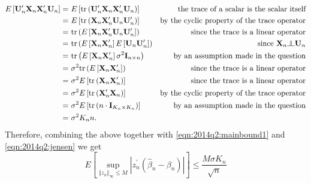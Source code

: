 \begin{align*}
  E \left[ \mathbf{U}_{n}^{\prime} \mathbf{X}_{n} \mathbf{X}_{n}^{\prime}
  \mathbf{U}_{n} \right] = & \ E \left[ \mathrm{tr} \left(
  \mathbf{U}_{n}^{\prime} \mathbf{X}_{n} \mathbf{X}_{n}^{\prime} \mathbf{U}_{n}
  \right) \right] & \text{the trace of a scalar is the scalar itself} \\
  = & \ E \left[ \mathrm{tr} \left( \mathbf{X}_{n} \mathbf{X}_{n}^{\prime}
  \mathbf{U}_{n} \mathbf{U}_{n}^{\prime} \right) \right] & \text{by the
  cyclic property of the trace operator} \\
  = & \ \mathrm{tr} \left( E \left[ \mathbf{X}_{n} \mathbf{X}_{n}^{\prime}
  \mathbf{U}_{n} \mathbf{U}_{n}^{\prime} \right] \right) & \text{since the
  trace is a linear operator} \\
  = & \ \mathrm{tr} \left( E \left[ \mathbf{X}_{n} \mathbf{X}_{n}^{\prime}
  \right] E \left[ \mathbf{U}_{n} \mathbf{U}_{n}^{\prime} \right] \right) &
  \text{since } \mathbf{X}_{n} \indep \mathbf{U}_{n} \\
  = & \ \mathrm{tr} \left( E \left[ \mathbf{X}_{n} \mathbf{X}_{n}^{\prime}
  \right] \sigma^{2} \mathbf{I}_{n \times n} \right) & \text{by an assumption
  made in the question} \\
  = & \ \sigma^{2} \mathrm{tr} \left( E \left[ \mathbf{X}_{n}
  \mathbf{X}_{n}^{\prime} \right] \right) & \text{since the trace is a
  linear operator} \\
  = & \ \sigma^{2} E \left[ \mathrm{tr} \left( \mathbf{X}_{n}
  \mathbf{X}_{n}^{\prime} \right) \right] & \text{since the trace is a
  linear operator} \\
  = & \ \sigma^{2} E \left[ \mathrm{tr} \left( \mathbf{X}_{n}^{\prime}
  \mathbf{X}_{n} \right) \right] & \text{by the cyclic property of the trace
  operator} \\
  = & \ \sigma^{2} E \left[ \mathrm{tr} \left( n \cdot \mathbf{I}_{K_{n} \times
  K_{n}} \right) \right] & \text{by an assumption made in the question} \\
  = & \ \sigma^{2} K_{n} n.
\end{align*}
Therefore, combining the above together with \eqref{eqn:2014q2:mainbound1} and
\eqref{eqn:2014q2:jensen} we get
\begin{equation}
  E \left[ \sup_{\left\Vert z_{n} \right\Vert_{\infty} \leq M} \left|
  z_{n}^{\prime} \left( \widehat{\beta}_{n} - \beta_{n} \right) \right| \right]
  \leq \frac{M \sigma K_{n}}{\sqrt{n}} \label{eqn:2014q2:mainbound2}
\end{equation}
